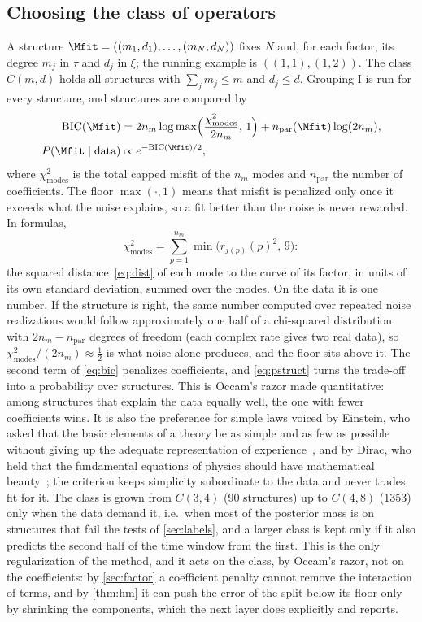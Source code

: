 \subsection{Choosing the class of operators}\label{sec:class}
A structure $\Mfit=((m_1,d_1),\dots,(m_N,d_N))$ fixes $N$ and, for each factor, its degree $m_j$ in $\tau$ and $d_j$ in
$\xi$; the running example is $((1,1),(1,2))$. The class $C(m,d)$ holds all structures with $\sum_jm_j\le m$ and
$d_j\le d$. Grouping I is run for every structure, and structures are compared by
\begin{align}
  \mathrm{BIC}(\Mfit)&=2n_m\log\max\!\Big(\frac{\chi^2_{\mathrm{modes}}}{2n_m},\,1\Big)+n_{\mathrm{par}}(\Mfit)\log(2n_m),\label{eq:bic}\\
  P(\Mfit\mid\text{data})&\propto e^{-\mathrm{BIC}(\Mfit)/2},\label{eq:pstruct}
\end{align}
where $\chi^2_{\mathrm{modes}}$ is the total capped misfit of the $n_m$ modes and $n_{\mathrm{par}}$ the number of coefficients. The floor
$\max(\cdot,1)$ means that misfit is penalized only once it exceeds what the noise explains, so a fit better than the
noise is never rewarded. In formulas,
\[
  \chi^2_{\mathrm{modes}}=\sum_{p=1}^{n_m}\min\big(r_{j(p)}(p)^2,\,9\big):
\]
the squared distance~\eqref{eq:dist} of each mode to the curve of its factor, in units of its own standard deviation,
summed over the modes. On the data it is one number. If the structure is right, the same number computed over repeated
noise realizations would follow approximately one half of a chi-squared distribution with $2n_m-n_{\mathrm{par}}$ degrees
of freedom (each complex rate gives two real data), so $\chi^2_{\mathrm{modes}}/(2n_m)\approx\frac12$ is what noise alone
produces, and the floor sits above it. The second term of \eqref{eq:bic} penalizes coefficients, and \eqref{eq:pstruct}
turns the trade-off into a probability over structures. This is Occam's razor made quantitative: among structures that
explain the data equally well, the one with fewer coefficients wins. It is also the preference for simple laws voiced by
Einstein, who asked that the basic elements of a theory be as simple and as few as possible without giving up the
adequate representation of experience~\cite{Ein34}, and by Dirac, who held that the fundamental equations of physics
should have mathematical beauty~\cite{Dir63}; the criterion keeps simplicity subordinate to the data and never trades fit
for it. The class is grown from $C(3,4)$ (90 structures) up to $C(4,8)$ (1353) only when the data demand
it, i.e.\ when most of the posterior mass is on structures that fail the tests of \cref{sec:labels}, and a larger class is
kept only if it also predicts the second half of the time window from the first. This is the only regularization of the
method, and it acts on the class, by Occam's razor, not on the coefficients: by \cref{sec:factor} a coefficient penalty
cannot remove the interaction of terms, and by \cref{thm:hm} it can push the error of the split below its floor only by
shrinking the components, which the next layer does explicitly and reports.


